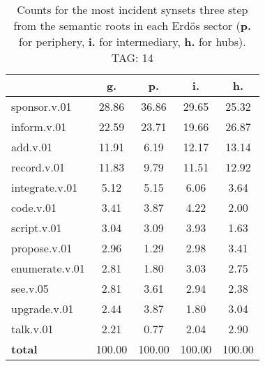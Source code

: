 \begin{table}[h!]
\begin{center}
\begin{tabular}{| l | c | c | c | c |}\hline
 & g. & p. & i. & h. \\\hline
sponsor.v.01 & 28.86  & 36.86  & 29.65  & 25.32 \\\hline
inform.v.01 & 22.59  & 23.71  & 19.66  & 26.87 \\\hline
add.v.01 & 11.91  & 6.19  & 12.17  & 13.14 \\\hline
record.v.01 & 11.83  & 9.79  & 11.51  & 12.92 \\\hline
integrate.v.01 & 5.12  & 5.15  & 6.06  & 3.64 \\\hline
code.v.01 & 3.41  & 3.87  & 4.22  & 2.00 \\\hline
script.v.01 & 3.04  & 3.09  & 3.93  & 1.63 \\\hline
propose.v.01 & 2.96  & 1.29  & 2.98  & 3.41 \\\hline
enumerate.v.01 & 2.81  & 1.80  & 3.03  & 2.75 \\\hline
see.v.05 & 2.81  & 3.61  & 2.94  & 2.38 \\\hline
upgrade.v.01 & 2.44  & 3.87  & 1.80  & 3.04 \\\hline
talk.v.01 & 2.21  & 0.77  & 2.04  & 2.90 \\\hline
{{\bf total}} & 100.00  & 100.00  & 100.00  & 100.00 \\\hline
\end{tabular}
\caption{Counts for the most incident synsets three step from the semantic roots in each Erd\"os sector ({\bf p.} for periphery, {\bf i.} for intermediary, {\bf h.} for hubs). TAG: 14}
\end{center}
\end{table}